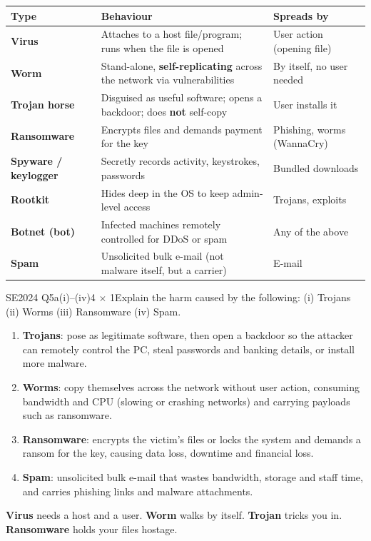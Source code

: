 \documentclass[10pt]{article}
\begin{document}
\begin{tabularx}{\linewidth}{@{}>{\bfseries}lXl@{}}
\toprule
Type & Behaviour & Spreads by\\\midrule
Virus & Attaches to a host file/program; runs when the file is opened & User action (opening file)\\
Worm & Stand-alone, \textbf{self-replicating} across the network via vulnerabilities & By itself, no user needed\\
Trojan horse & Disguised as useful software; opens a backdoor; does \textbf{not} self-copy & User installs it\\
Ransomware & Encrypts files and demands payment for the key & Phishing, worms (WannaCry)\\
Spyware / keylogger & Secretly records activity, keystrokes, passwords & Bundled downloads\\
Rootkit & Hides deep in the OS to keep admin-level access & Trojans, exploits\\
Botnet (bot) & Infected machines remotely controlled for DDoS or spam & Any of the above\\
Spam & Unsolicited bulk e-mail (not malware itself, but a carrier) & E-mail\\
\bottomrule
\end{tabularx}

\begin{pastq}{SE2024 Q5a(i)--(iv)}{4 $\times$ 1}Explain the harm caused by the following: (i) Trojans (ii) Worms (iii) Ransomware (iv) Spam.\end{pastq}
\begin{ans}
\begin{enumerate}[label=(\roman*)]
\item \textbf{Trojans}: pose as legitimate software, then open a backdoor so the attacker can remotely control the PC, steal passwords and banking details, or install more malware.
\item \textbf{Worms}: copy themselves across the network without user action, consuming bandwidth and CPU (slowing or crashing networks) and carrying payloads such as ransomware.
\item \textbf{Ransomware}: encrypts the victim's files or locks the system and demands a ransom for the key, causing data loss, downtime and financial loss.
\item \textbf{Spam}: unsolicited bulk e-mail that wastes bandwidth, storage and staff time, and carries phishing links and malware attachments.
\end{enumerate}
\end{ans}
\begin{mnemonic}
\textbf{Virus} needs a host and a user. \textbf{Worm} walks by itself. \textbf{Trojan} tricks you in. \textbf{Ransomware} holds your files hostage.
\end{mnemonic}
\end{document}
